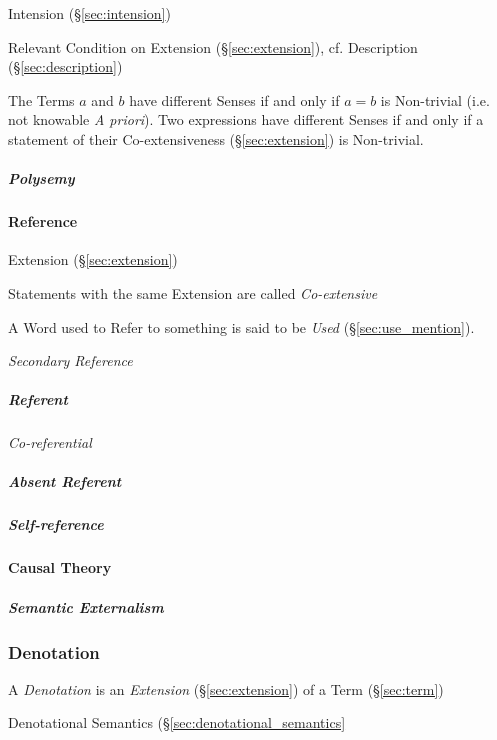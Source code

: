 Intension (\S\ref{sec:intension})

Relevant Condition on Extension (\S\ref{sec:extension}), cf.
Description (\S\ref{sec:description})

The Terms $a$ and $b$ have different Senses if and only if $a = b$ is
Non-trivial (i.e. not knowable \emph{A priori}). Two expressions have
different Senses if and only if a statement of their Co-extensiveness
(\S\ref{sec:extension}) is Non-trivial.

\subparagraph{Polysemy}\label{sec:polysemy}\hfill



\paragraph{Reference}\label{sec:reference}\hfill

Extension (\S\ref{sec:extension})

Statements with the same Extension are called \emph{Co-extensive}

A Word used to Refer to something is said to be \emph{Used}
(\S\ref{sec:use_mention}).

\emph{Secondary Reference}

\subparagraph{Referent}\label{sec:referent}\hfill

\emph{Co-referential}

\subparagraph{Absent Referent}\label{sec:absent_referent}\hfill

\subparagraph{Self-reference}\label{sec:self_reference}\hfill



\paragraph{Causal Theory}\label{sec:causal_reference}\hfill

\subparagraph{Semantic Externalism}\label{sec:semantic_externalism}\hfill



\subsubsection{Denotation}\label{sec:denotation}

A \emph{Denotation} is an \emph{Extension} (\S\ref{sec:extension}) of
a Term (\S\ref{sec:term})

Denotational Semantics (\S\ref{sec:denotational_semantics}



